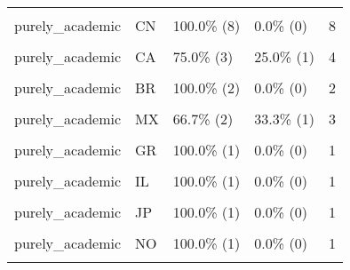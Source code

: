 \documentclass[
]{article}
\begin{document}
\begin{longtable}[t]{llllr}
\endfoot
\bottomrule
\endlastfoot
\cellcolor{gray!6}{purely\_academic} & \cellcolor{gray!6}{US} & \cellcolor{gray!6}{94.7\%  (18)} & \cellcolor{gray!6}{5.3\%  (1)} & \cellcolor{gray!6}{19}\\
purely\_academic & CN & 100.0\%   (8) & 0.0\%  (0) & 8\\
\cellcolor{gray!6}{purely\_academic} & \cellcolor{gray!6}{HK} & \cellcolor{gray!6}{77.8\%   (7)} & \cellcolor{gray!6}{22.2\%  (2)} & \cellcolor{gray!6}{9}\\
purely\_academic & CA & 75.0\%   (3) & 25.0\%  (1) & 4\\
\cellcolor{gray!6}{purely\_academic} & \cellcolor{gray!6}{TW} & \cellcolor{gray!6}{100.0\%   (3)} & \cellcolor{gray!6}{0.0\%  (0)} & \cellcolor{gray!6}{3}\\
\addlinespace
purely\_academic & BR & 100.0\%   (2) & 0.0\%  (0) & 2\\
\cellcolor{gray!6}{purely\_academic} & \cellcolor{gray!6}{GB} & \cellcolor{gray!6}{66.7\%   (2)} & \cellcolor{gray!6}{33.3\%  (1)} & \cellcolor{gray!6}{3}\\
purely\_academic & MX & 66.7\%   (2) & 33.3\%  (1) & 3\\
\cellcolor{gray!6}{purely\_academic} & \cellcolor{gray!6}{CO} & \cellcolor{gray!6}{100.0\%   (1)} & \cellcolor{gray!6}{0.0\%  (0)} & \cellcolor{gray!6}{1}\\
purely\_academic & GR & 100.0\%   (1) & 0.0\%  (0) & 1\\
\addlinespace
\cellcolor{gray!6}{purely\_academic} & \cellcolor{gray!6}{HU} & \cellcolor{gray!6}{100.0\%   (1)} & \cellcolor{gray!6}{0.0\%  (0)} & \cellcolor{gray!6}{1}\\
purely\_academic & IL & 100.0\%   (1) & 0.0\%  (0) & 1\\
\cellcolor{gray!6}{purely\_academic} & \cellcolor{gray!6}{IN} & \cellcolor{gray!6}{50.0\%   (1)} & \cellcolor{gray!6}{50.0\%  (1)} & \cellcolor{gray!6}{2}\\
purely\_academic & JP & 100.0\%   (1) & 0.0\%  (0) & 1\\
\cellcolor{gray!6}{purely\_academic} & \cellcolor{gray!6}{NL} & \cellcolor{gray!6}{100.0\%   (1)} & \cellcolor{gray!6}{0.0\%  (0)} & \cellcolor{gray!6}{1}\\
\addlinespace
purely\_academic & NO & 100.0\%   (1) & 0.0\%  (0) & 1\\
\cellcolor{gray!6}{purely\_academic} & \cellcolor{gray!6}{PH} & \cellcolor{gray!6}{100.0\%   (1)} & \cellcolor{gray!6}{0.0\%  (0)} & \cellcolor{gray!6}{1}\\

\end{longtable}
\end{document}
